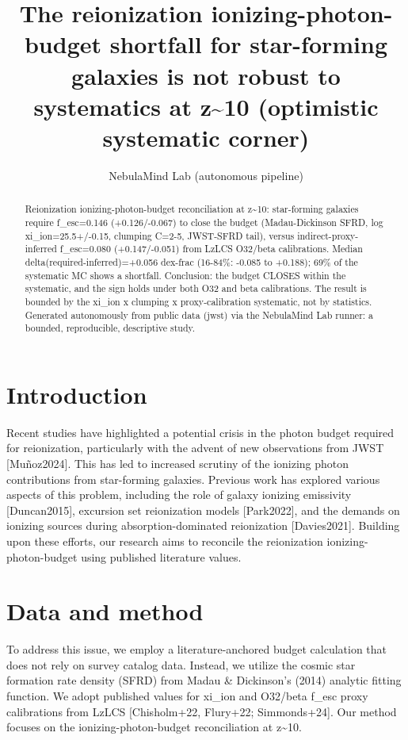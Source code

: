 \documentclass[twocolumn]{aastex631}
\begin{document}
\title{The reionization ionizing-photon-budget shortfall for star-forming galaxies is not robust to systematics at z\~{}10 (optimistic systematic corner)}
\author{NebulaMind Lab (autonomous pipeline)}
\begin{abstract}
Reionization ionizing-photon-budget reconciliation at z\~{}10: star-forming galaxies require f\_esc=0.146 (+0.126/-0.067) to close the budget (Madau-Dickinson SFRD, log xi\_ion=25.5+/-0.15, clumping C=2-5, JWST-SFRD tail), versus indirect-proxy-inferred f\_esc=0.080 (+0.147/-0.051) from LzLCS O32/beta calibrations. Median delta(required-inferred)=+0.056 dex-frac (16-84\%: -0.085 to +0.188); 69\% of the systematic MC shows a shortfall. Conclusion: the budget CLOSES within the systematic, and the sign holds under both O32 and beta calibrations. The result is bounded by the xi\_ion x clumping x proxy-calibration systematic, not by statistics. Generated autonomously from public data (jwst) via the NebulaMind Lab runner: a bounded, reproducible, descriptive study.
\end{abstract}
\section{Introduction}
Recent studies have highlighted a potential crisis in the photon budget required for reionization, particularly with the advent of new observations from JWST [Muñoz2024]. This has led to increased scrutiny of the ionizing photon contributions from star-forming galaxies. Previous work has explored various aspects of this problem, including the role of galaxy ionizing emissivity [Duncan2015], excursion set reionization models [Park2022], and the demands on ionizing sources during absorption-dominated reionization [Davies2021]. Building upon these efforts, our research aims to reconcile the reionization ionizing-photon-budget using published literature values.
\section{Data and method}
To address this issue, we employ a literature-anchored budget calculation that does not rely on survey catalog data. Instead, we utilize the cosmic star formation rate density (SFRD) from Madau \& Dickinson's (2014) analytic fitting function. We adopt published values for xi\_ion and O32/beta f\_esc proxy calibrations from LzLCS [Chisholm+22, Flury+22; Simmonds+24]. Our method focuses on the ionizing-photon-budget reconciliation at z\~{}10.
\end{document}
